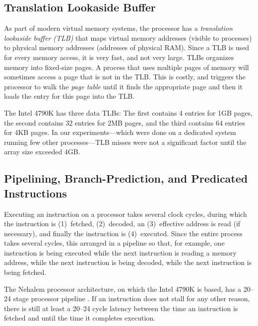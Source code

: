 \documentclass{patmorin}
\begin{document}
\subsection{Translation Lookaside Buffer}

As part of modern virtual memory systems, the processor has a
\emph{translation lookaside buffer (TLB)} that maps virtual memory
addresses (visible to processes) to physical memory addresses (addresses
of physical RAM).  Since a TLB is used for every memory access, it is very
fast, and not very large.  TLBs organizes memory into fixed-size pages.
A process that uses multiple pages of memory will sometimes access a
page that is not in the TLB. This is costly, and triggers the processor
to walk the \emph{page table} until it finds the appropriate page and
then it loads the entry for this page into the TLB.

The Intel 4790K has three data TLBs: The first contains 4 entries for
1GB pages, the second contains 32 entries for 2MB pages, and the third
contains 64 entries for 4KB pages.  In our experiments---which were done
on a dedicated system running few other processes---TLB misses were not
a significant factor until the array size exceeded 4GB.


\subsection{Pipelining, Branch-Prediction, and Predicated Instructions}

Executing an instruction on a processor takes several clock cycles, during
which the instruction is (1)~fetched, (2)~decoded, an (3)~effective
address is read (if necessary), and finally the instruction is
(4)~executed.  Since the entire process takes several cycles, this
arranged in a pipeline so that, for example, one instruction is being
executed while the next instruction is reading a memory address, while
the next instruction is being decoded, while the next instruction is
being fetched.

The Nehalem processor architecture, on which the Intel 4790K is based, has
a 20--24 stage processor pipeline \cite{bit-tech:intel}. If an instruction
does not stall for any other reason, there is still at least a 20--24
cycle latency between the time an instruction is fetched and until the
time it completes execution.
\end{document}
